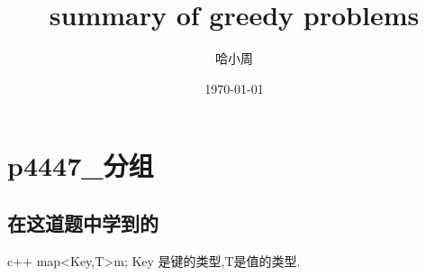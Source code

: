 \documentclass[UTF8]{ctexart}
\author{哈小周}
\date{\today}
\title{summary of greedy problems}
\begin{document}
\section*{p4447_分组}
\subsection*{在这道题中学到的}
c++
map<Key,T>m;
Key 是键的类型,T是值的类型.
\end{document}
